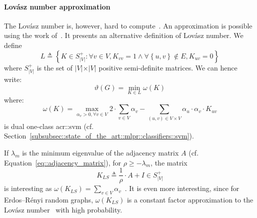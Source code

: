                 \paragraph{Lov\'asz number approximation}
                    The Lov\'asz number is, however, hard to compute~\parencite{johansson2014global}.
                    An approximation is possible using the work of~\textcite{jethava2013lovasz}.
                    It presents an alternative definition of Lov\'asz number.
                    We define $$L \triangleq \left\{K \in S_{\vert V \vert}^+: \forall v \in V, K_{vv} = 1 \wedge \forall \left\{u, v\right\}  \notin E, K_{uv} = 0\right\}$$ where $S_{\vert V \vert}^+$ is the set of $\vert V \vert \times \vert V \vert$ positive semi-definite matrices.
                    We can hence write:
                    \begin{equation}
                        \label{eq::lovazs_number_alternative}
                        \vartheta(G) = \min_{K \in L} \omega(K)
                    \end{equation}
                    where:
                    \begin{equation}
                        \omega(K) = \max_{\alpha_v > 0, \forall v \in V} 2\cdot \sum_{v\in V} \alpha_v - \sum_{(u, v) \in V\times V} \alpha_u \cdot \alpha_v \cdot K_{uv}
                    \end{equation}
                    is dual one-class \gls{acr::svm} (cf. Section~\ref{subsubsec::state_of_the_art::mlpr::classifiers::svm}).

                    If $\lambda_m$ is the minimum eigenvalue of the adjacency matrix $A$ (cf. Equation~\ref{eq::adjacency_matrix}), for $\rho\geq-\lambda_m$, the matrix
                    \begin{equation}
                        \label{eq::ls_matrix}
                        K_{LS} \triangleq \frac{1}{\rho} \cdot A + I \in S_{\vert V \vert}^+
                    \end{equation}
                    is interesting as $\omega(K_{LS}) = \sum_{v\in V} \alpha_v$~\parencite{jethava2013lovasz}.
                    It is even more interesting, since for Erdos–R\'enyi random graphs, $\omega(K_{LS})$ is a constant factor approximation to the Lov\'asz number~\parencite{jethava2013lovasz} with high probability.

